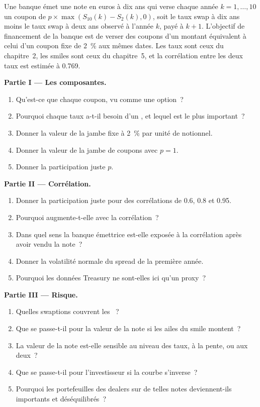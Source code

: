 \begin{problem}\label{pb:rc:convexity-adjustments-and-constant-maturity-products:1}
Une banque émet une note en euros à dix ans qui verse chaque année $k=1,\dots,10$ un coupon de
$p\times\max(S_{10}(k)-S_2(k),0)$, soit le taux swap à dix ans moins le taux swap à deux ans
observé à l'année $k$, payé à $k+1$. L'objectif de financement de la banque est de verser des coupons
d'un montant équivalent à celui d'un coupon fixe de 2~\% aux mêmes dates. Les taux sont ceux du
chapitre~2, les smiles sont ceux du chapitre~5, et la corrélation entre les deux taux
est estimée à 0.769.

\medskip\noindent\textbf{Partie I --- Les composantes.}
\begin{enumerate}
\item Qu'est-ce que chaque coupon, vu comme une option~?
\item Pourquoi chaque taux a-t-il besoin d'un , et lequel est le plus important~?
\item Donner la valeur de la jambe fixe à 2~\% par unité de notionnel.
\item Donner la valeur de la jambe de coupons avec $p=1$.
\item Donner la participation juste $p$.
\end{enumerate}

\medskip\noindent\textbf{Partie II --- Corrélation.}
\begin{enumerate}[resume]
\item Donner la participation juste pour des corrélations de 0.6, 0.8 et 0.95.
\item Pourquoi augmente-t-elle avec la corrélation~?
\item Dans quel sens la banque émettrice est-elle exposée à la corrélation après avoir vendu la note~?
\item Donner la volatilité normale du spread de la première année.
\item Pourquoi les données Treasury ne sont-elles ici qu'un proxy~?
\end{enumerate}

\medskip\noindent\textbf{Partie III --- Risque.}
\begin{enumerate}[resume]
\item Quelles swaptions couvrent les ~?
\item Que se passe-t-il pour la valeur de la note si les ailes du smile montent~?
\item La valeur de la note est-elle sensible au niveau des taux, à la pente, ou aux deux~?
\item Que se passe-t-il pour l'investisseur si la courbe s'inverse~?
\item Pourquoi les portefeuilles des dealers sur de telles notes deviennent-ils importants et déséquilibrés~?
\end{enumerate}


\end{problem}
